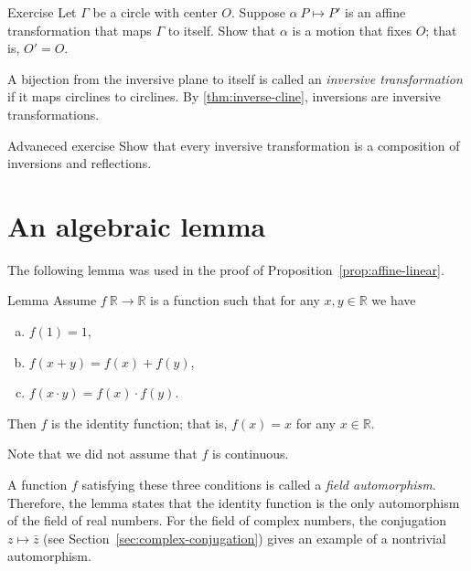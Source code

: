 \begin{thm}{Exercise}\label{ex:preserved-circle}
Let $\Gamma$ be a circle with center $O$.
Suppose $\alpha\:P\mapsto P'$ is an affine transformation that maps $\Gamma$ to itself.
Show that $\alpha$ is a motion that fixes $O$;
that is, $O'=O$.
\end{thm}

A bijection from the inversive plane to itself is called an \emph{inversive transformation} if it maps circlines to circlines.
By \ref{thm:inverse-cline},  inversions are  inversive transformations.

\begin{thm}{Advaneced exercise}\label{ex:inversions-inversive}
Show that every inversive transformation is a composition of inversions and reflections.
\end{thm}



\section{An algebraic lemma}

The following lemma was used in the proof of Proposition~\ref{prop:affine-linear}.

\begin{thm}{Lemma}\label{lem:R-auto}
Assume $f\:\mathbb{R}\to\mathbb{R}$ is a function such that for any $x,y\in\mathbb{R}$ we have
\begin{enumerate}[(a)]
\item\label{lem:R-auto:a} $f(1)=1$,
\item\label{lem:R-auto:b} $f(x+y)=f(x)+f(y)$,
\item\label{lem:R-auto:c} $f(x\cdot y)=f(x)\cdot f(y)$.
\end{enumerate}

Then $f$ is the identity function; that is,
$f(x)=x$ for any $x\in \mathbb{R}$.
\end{thm}

Note that we did not assume that $f$ is continuous.

A function $f$ satisfying these three conditions
is called a \emph{field automorphism}.
Therefore, the lemma states that the identity function is the only automorphism of the field of real numbers.
For the field of complex numbers, the conjugation $z\mapsto\bar z$ (see Section~\ref{sec:complex-conjugation}) gives an example of a nontrivial automorphism.

